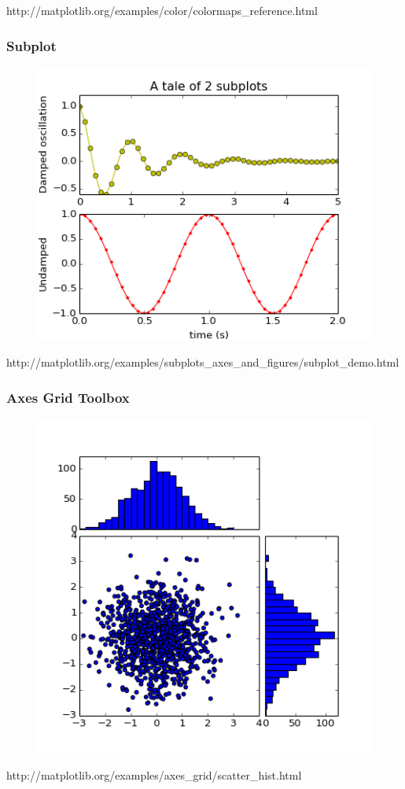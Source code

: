 \documentclass[ignorenonframetext]{beamer}
\begin{document}
\begin{frame}[t]
\begin{figure}
	\end{figure}
	\vfill
	\tiny{http://matplotlib.org/examples/color/colormaps\_reference.html}
\end{frame}



\begin{frame}[t]\frametitle{Subplot}
	\begin{figure}
		\centering
		\includegraphics[width=.6\textwidth]{figures/subplot_demo2}
	\end{figure}
	\tiny{http://matplotlib.org/examples/subplots\_axes\_and\_figures/subplot\_demo.html}
\end{frame}


\begin{frame}[t]\frametitle{Axes Grid Toolbox}
	\begin{figure}
		\centering
		\includegraphics[width=.6\textwidth]{figures/axes_grid}
	\end{figure}
	\tiny{http://matplotlib.org/examples/axes\_grid/scatter\_hist.html}
\end{frame}
\end{document}
